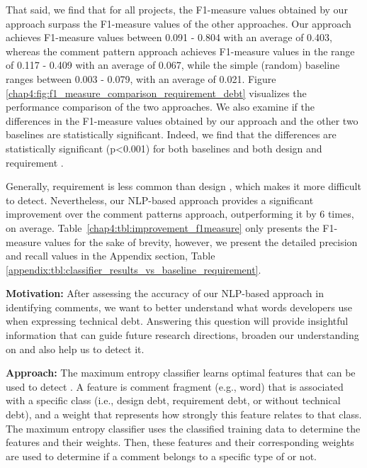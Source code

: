 That said, we find that for all projects, the F1-measure values obtained by our approach surpass the F1-measure values of the other approaches. Our approach achieves F1-measure values between 0.091 - 0.804 with an average of 0.403, whereas the comment pattern approach achieves F1-measure values in the range of 0.117 - 0.409 with an average of 0.067, while the simple (random) baseline ranges between 0.003 - 0.079, with an average of 0.021. Figure \ref{chap4:fig:f1_measure_comparison_requirement_debt} visualizes the performance comparison of the two approaches. We also examine if the differences in the F1-measure values obtained by our approach and the other two baselines are statistically significant. Indeed, we find that the differences are statistically significant (p\textless0.001) for both baselines and both design and requirement \SATD.

Generally, requirement \SATD is less common than design \SATD, which makes it more difficult to detect. Nevertheless, our NLP-based approach provides a significant improvement over the comment patterns approach, outperforming it by 6 times, on average. Table~\ref{chap4:tbl:improvement_f1measure} only presents the F1-measure values for the sake of brevity, however, we present the detailed precision and recall values in the Appendix section, Table \ref{appendix:tbl:classifier_results_vs_baseline_requirement}.


\vspace{3mm}
\noindent\chapterIVrqii
\vspace{3mm}

\noindent \textbf{Motivation:} After assessing the accuracy of our NLP-based approach in identifying \SATD comments, we want to better understand what words developers use when expressing technical debt. Answering this question will provide insightful information that can guide future research directions, broaden our understanding on \SATD and also help us to detect it.     

\vspace{1mm}
\noindent \textbf{Approach:} The maximum entropy classifier learns optimal features that can be used to detect \SATD. A feature is comment fragment (e.g., word) that is associated with a specific class (i.e., design debt, requirement debt, or without technical debt), and a weight that represents how strongly this feature relates to that class. The maximum entropy classifier uses the classified training data to determine the features and their weights. Then, these features and their corresponding weights are used to determine if a comment belongs to a specific type of \SATD or not.

